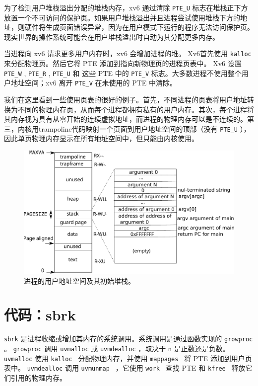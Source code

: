 为了检测用户堆栈溢出分配的堆栈内存，xv6 通过清除    \lstinline{PTE_U}    标志在堆栈正下方放置一个不可访问的保护页。如果用户堆栈溢出并且进程尝试使用堆栈下方的地址，则硬件将生成页面错误异常，因为在用户模式下运行的程序无法访问保护页。现实世界的操作系统可能会在用户堆栈溢出时自动为其分配更多内存。  

当进程向 xv6 请求更多用户内存时，xv6 会增加进程的堆。 Xv6首先使用 {    \tt    kalloc   } 来分配物理页。然后它将 PTE 添加到指向新物理页的进程页表中。 Xv6 设置
    \lstinline{PTE_W}    ,
    \lstinline{PTE_R}    ,
    \lstinline{PTE_U}    和
 这些 PTE 中的    \lstinline{PTE_V}    标志。大多数进程不使用整个用户地址空间；xv6 离开
    \lstinline{PTE_V}    在未使用的 PTE 中清除。  

我们在这里看到一些使用页表的很好的例子。首先，不同进程的页表将用户地址转换为不同的物理内存页，从而每个进程都拥有私有的用户内存。其次，每个进程将其内存视为具有从零开始的连续虚拟地址，而进程的物理内存可以是不连续的。第三，内核用trampoline代码映射一个页面到用户地址空间的顶部（没有
    \lstinline{PTE_U}    ），因此单页物理内存显示在所有地址空间中，但只能由内核使用。  

   \begin{figure}[t]
\center
\includegraphics[scale=0.5]{fig/processlayout.pdf}
\caption{进程的用户地址空间及其初始堆栈。  }
\label{fig:processlayout}
\end{figure}     

   \section{代码：sbrk  }     

   \lstinline{sbrk}    是进程收缩或增加其内存的系统调用。系统调用是通过函数实现的
    \lstinline{growproc}   
        。
    \lstinline{growproc}    调用    \lstinline{uvmalloc}    或
    \lstinline{uvmdealloc}    ，取决于    \lstinline{n}    是正数还是负数。
    \lstinline{uvmalloc}   
        使用  {    \tt    kalloc   }  分配物理内存，并使用  {    \tt    mappages   }  将 PTE 添加到用户页表中。
    \lstinline{uvmdealloc}    调用
  {    \tt    uvmunmap   } 
     ，它使用  {    \tt    work   }  查找 PTE 和
  {    \tt    kfree   }  释放它们引用的物理内存。  

